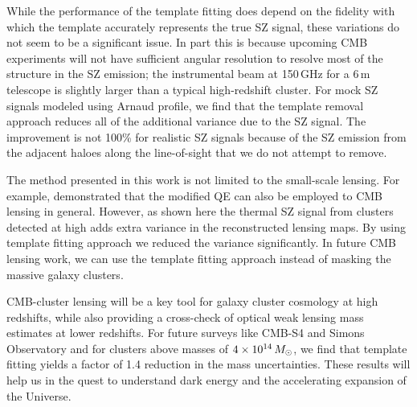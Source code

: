 While the performance of the template fitting does depend on the fidelity with which the template accurately represents the true SZ signal, these variations do not seem to be a significant issue. 
In part this is because upcoming CMB experiments will not have sufficient angular resolution to resolve most of the structure in the SZ emission; the instrumental beam at 150\,GHz for a 6\,m telescope is slightly larger than a typical high-redshift cluster. 
For mock SZ signals modeled using Arnaud profile, we find that the template removal approach reduces all of the additional variance due to the SZ signal. 
The improvement is not 100\% for realistic SZ signals \citep{sehgal10, takahashi17} because of the SZ emission from the adjacent haloes along the line-of-sight that we do not attempt to remove. 

The method presented in this work is not limited to the small-scale lensing. 
For example, \citet{madhavacheril18} demonstrated that the modified QE can also be employed to CMB lensing in general. 
However, as shown here the thermal SZ signal from clusters detected at high \snr{} adds extra variance in the reconstructed lensing maps. 
By using template fitting approach we reduced the variance significantly. 
In future CMB lensing work, we can use the template fitting approach instead of masking the massive galaxy clusters. 

CMB-cluster lensing will be a key tool for galaxy cluster cosmology at high redshifts, while also providing a cross-check of optical weak lensing mass estimates at lower redshifts. 
For future surveys like CMB-S4 and Simons Observatory and for clusters above masses of $4\times 10^{14}\,{M}_{\odot}$, we find that template fitting yields a factor of 1.4 reduction in the mass uncertainties. 
These results will help us in the quest to understand dark energy and the accelerating expansion of the Universe.


